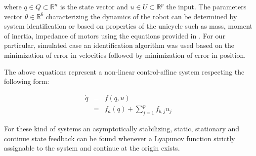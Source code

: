 \documentclass[letterpaper, 10 pt, conference]{ieeeconf}  %
\begin{document}
where ${q \in Q \subset \mathds{R}^n}$ is the state vector and ${u \in U \subset \mathds{R}^p}$ the input. The parameters vector ${\theta \in \mathds{R}^6}$ characterizing the dynamics of the robot can be determined by system identification or based on properties of the unicycle such as mass, moment of inertia, impedance of motors using the equations provided in \cite{de2006dynamic}. For our particular, simulated case an identification algorithm was used based on the minimization of error in velocities followed by minimization of error in position.

The above equations represent a non-linear control-affine system respecting the following form:

\begin{eqnarray}
\dot{q} &=& f(q, u)\nonumber\\
&=& f_a(q) + \sum_{j=1}^pf_{b,j}u_j
\label{eq:controlaffine}
\end{eqnarray}

For these kind of systems an asymptotically stabilizing, static, stationary and continue state feedback can be found whenever a Lyapunov function strictly assignable to the system and continue at the origin exists.

%
\end{document}
